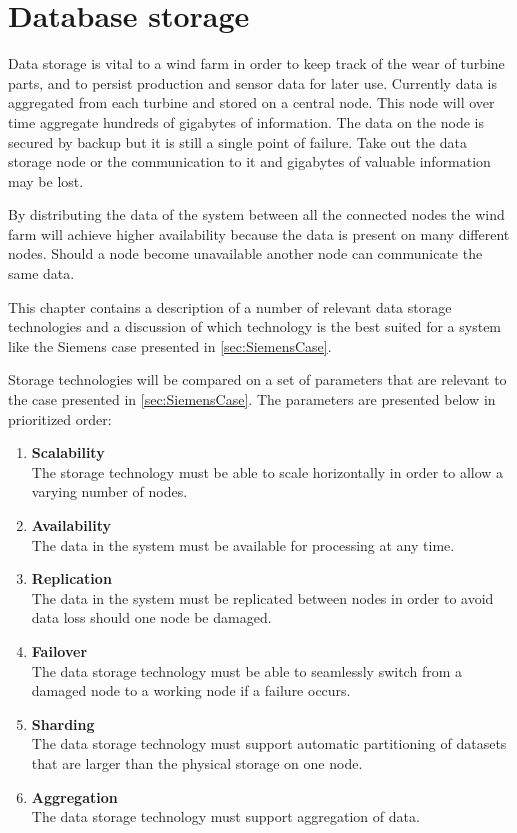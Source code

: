 \section{Database storage}
\label{sec:databaseStorage}
Data storage is vital to a wind farm in order to keep track of the wear of turbine parts, and to persist production and sensor data for later use.
Currently data is aggregated from each turbine and stored on a central node.
This node will over time aggregate hundreds of gigabytes of information.
The data on the node is secured by backup but it is still a single point of failure.
Take out the data storage node or the communication to it and gigabytes of valuable information may be lost.

By distributing the data of the system between all the connected nodes the wind farm will achieve higher availability because the data is present on many different nodes.
Should a node become unavailable another node can communicate the same data.

This chapter contains a description of a number of relevant data storage technologies and a discussion of which technology is the best suited for a system like the Siemens case presented in \cref{sec:SiemensCase}.

Storage technologies will be compared on a set of parameters that are relevant to the case presented in \cref{sec:SiemensCase}. The parameters are presented below in prioritized order:

\begin{enumerate}
\item \textbf{Scalability} \\
The storage technology must be able to scale horizontally in order to allow a varying number of nodes.

\item \textbf{Availability} \\
The data in the system must be available for processing at any time.

\item \textbf{Replication} \\
The data in the system must be replicated between nodes in order to avoid data loss should one node be damaged.
\item \textbf{Failover} \\
The data storage technology must be able to seamlessly switch from a damaged node to a working node if a failure occurs.

\item \textbf{Sharding} \\
The data storage technology must support automatic partitioning of datasets that are larger than the physical storage on one node.

\item \textbf{Aggregation} \\
The data storage technology must support aggregation of data.
\end{enumerate}

